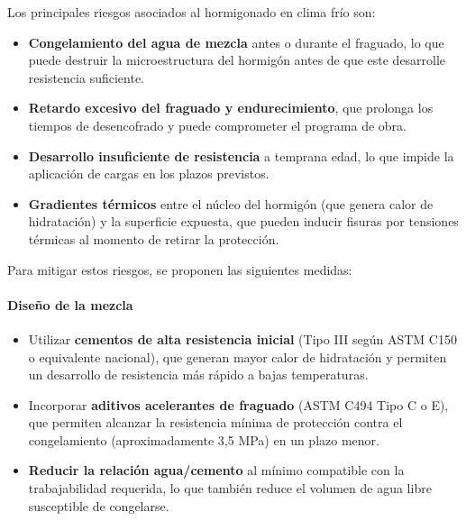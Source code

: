 Los principales riesgos asociados al hormigonado en clima frío son:

\begin{itemize}
    \item \textbf{Congelamiento del agua de mezcla} antes o durante el fraguado, lo que puede destruir la microestructura del hormigón antes de que este desarrolle resistencia suficiente.
    \item \textbf{Retardo excesivo del fraguado y endurecimiento}, que prolonga los tiempos de desencofrado y puede comprometer el programa de obra.
    \item \textbf{Desarrollo insuficiente de resistencia} a temprana edad, lo que impide la aplicación de cargas en los plazos previstos.
    \item \textbf{Gradientes térmicos} entre el núcleo del hormigón (que genera calor de hidratación) y la superficie expuesta, que pueden inducir fisuras por tensiones térmicas al momento de retirar la protección.
\end{itemize}

\noindent Para mitigar estos riesgos, se proponen las siguientes medidas:

\paragraph{Diseño de la mezcla}
\begin{itemize}
    \item Utilizar \textbf{cementos de alta resistencia inicial} (Tipo III según ASTM C150 o equivalente nacional), que generan mayor calor de hidratación y permiten un desarrollo de resistencia más rápido a bajas temperaturas.
    \item Incorporar \textbf{aditivos acelerantes de fraguado} (ASTM C494 Tipo C o E), que permiten alcanzar la resistencia mínima de protección contra el congelamiento (aproximadamente 3,5 MPa) en un plazo menor.
    \item \textbf{Reducir la relación agua/cemento} al mínimo compatible con la trabajabilidad requerida, lo que también reduce el volumen de agua libre susceptible de congelarse.
\end{itemize}

